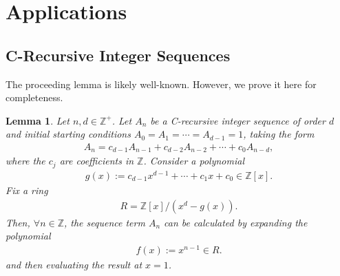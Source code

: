 \documentclass[12pt]{article}
\theoremstyle{plain}
\newtheorem{lemma}[theorem]{Lemma}
\theoremstyle{definition}
\begin{document}
\section{Applications} \label{section:applications}

\subsection{C-Recursive Integer Sequences}
The proceeding lemma is likely well-known. However, we prove it here for completeness.

\begin{lemma} \label{lemma:recurrences}
Let $n,d \in \mathbb{Z}^+$. Let $A_n$ be a C-recursive integer sequence of order $d$ and initial starting conditions $A_0=A_1=\cdots=A_{d-1}=1$, taking the form
\begin{align*}
    A_{n} = c_{d-1} A_{n-1} + c_{d-2} A_{n-2} + \cdots + c_{0} A_{n-d} ,
\end{align*}
where the $c_j$ are coefficients in $\mathbb{Z}$. Consider a polynomial
\begin{align*}
    g(x) := c_{d-1} x^{d-1} + \cdots + c_1 x + c_0 \in \mathbb{Z}[x] .
\end{align*}
Fix a ring
\begin{align*}
    R = \mathbb{Z}[x]/(x^d-g(x)) .
\end{align*}
Then, $\forall n \in \mathbb{Z}$, the sequence term $A_n$ can be calculated by expanding the polynomial 
\begin{align*}
    f(x) := x^{n-1} \in R .
\end{align*}
and then evaluating the result at $x=1$.
\end{lemma}
\end{document}
